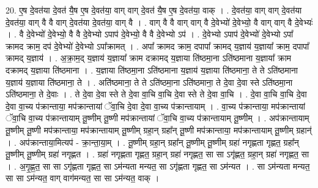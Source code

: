 \documentclass[17pt]{extarticle}
\begin{document}
20. ए॒ष दे॒वत॑या दे॒वत॑ यै॒ष ए॒ष दे॒वत॑या॒ वाग् वाग् दे॒वत॑ यै॒ष ए॒ष दे॒वत॑या॒ वाक् । . दे॒वत॑या॒ वाग् वाग् दे॒वत॑या दे॒वत॑या॒ वाग् वै वै वाग् दे॒वत॑या दे॒वत॑या॒ वाग् वै । . वाग् वै वै वाग् वाग् वै दे॒वेभ्यो॑ दे॒वेभ्यो॒ वै वाग् वाग् वै दे॒वेभ्यः॑ । . वै दे॒वेभ्यो॑ दे॒वेभ्यो॒ वै वै दे॒वेभ्यो ऽपाप॑ दे॒वेभ्यो॒ वै वै दे॒वेभ्यो ऽप॑ । . दे॒वेभ्यो ऽपाप॑ दे॒वेभ्यो॑ दे॒वेभ्यो ऽपा᳚ क्रामद क्राम॒ दप॑ दे॒वेभ्यो॑ दे॒वेभ्यो ऽपा᳚क्रामत् । . अपा᳚ क्रामद क्राम॒ दपापा᳚ क्रामद् य॒ज्ञाय॑ य॒ज्ञाया᳚ क्राम॒ दपापा᳚ क्रामद् य॒ज्ञाय॑ । . अ॒क्रा॒म॒द् य॒ज्ञाय॑ य॒ज्ञाया᳚ क्राम दक्रामद् य॒ज्ञाया ति॑ष्ठमा॒ना ऽति॑ष्ठमाना य॒ज्ञाया᳚ क्राम दक्रामद् य॒ज्ञाया ति॑ष्ठमाना । . य॒ज्ञाया ति॑ष्ठमा॒ना ऽति॑ष्ठमाना य॒ज्ञाय॑ य॒ज्ञाया ति॑ष्ठमाना॒ ते ते ऽति॑ष्ठमाना य॒ज्ञाय॑ य॒ज्ञाया ति॑ष्ठमाना॒ ते । . अति॑ष्ठमाना॒ ते ते ऽति॑ष्ठमा॒ना ऽति॑ष्ठमाना॒ ते दे॒वा दे॒वा स्ते ऽति॑ष्ठमा॒ना ऽति॑ष्ठमाना॒ ते दे॒वाः । . ते दे॒वा दे॒वा स्ते ते दे॒वा वा॒चि वा॒चि दे॒वा स्ते ते दे॒वा वा॒चि । . दे॒वा वा॒चि वा॒चि दे॒वा दे॒वा वा॒च्य प॑क्रान्ताया॒ मप॑क्रान्तायां ॅवा॒चि दे॒वा दे॒वा वा॒च्य प॑क्रान्तायाम् । . वा॒च्य प॑क्रान्ताया॒ मप॑क्रान्तायां ॅवा॒चि वा॒च्य प॑क्रान्तायाम् तू॒ष्णीम् तू॒ष्णी मप॑क्रान्तायां ॅवा॒चि वा॒च्य प॑क्रान्तायाम् तू॒ष्णीम् । . अप॑क्रान्तायाम् तू॒ष्णीम् तू॒ष्णी मप॑क्रान्ताया॒ मप॑क्रान्तायाम् तू॒ष्णीम् ग्रहा॒न् ग्रहा᳚न् तू॒ष्णी मप॑क्रान्ताया॒ मप॑क्रान्तायाम् तू॒ष्णीम् ग्रहान्॑ । . अप॑क्रान्ताया॒मित्यप॑ - क्रा॒न्ता॒या॒म् । . तू॒ष्णीम् ग्रहा॒न् ग्रहा᳚न् तू॒ष्णीम् तू॒ष्णीम् ग्रहा॑ नगृह्णता गृह्णत॒ ग्रहा᳚न् तू॒ष्णीम् तू॒ष्णीम् ग्रहा॑ नगृह्णत । . ग्रहा॑ नगृह्णता गृह्णत॒ ग्रहा॒न् ग्रहा॑ नगृह्णत॒ सा सा ऽगृ॑ह्णत॒ ग्रहा॒न् ग्रहा॑ नगृह्णत॒ सा । . अ॒गृ॒ह्ण॒त॒ सा सा ऽगृ॑ह्णता गृह्णत॒ सा ऽम॑न्यता मन्यत॒ सा ऽगृ॑ह्णता गृह्णत॒ सा ऽम॑न्यत । . सा ऽम॑न्यता मन्यत॒ सा सा ऽम॑न्यत॒ वाग् वाग॑मन्यत॒ सा सा ऽम॑न्यत॒ वाक् । \newline
\end{document}
